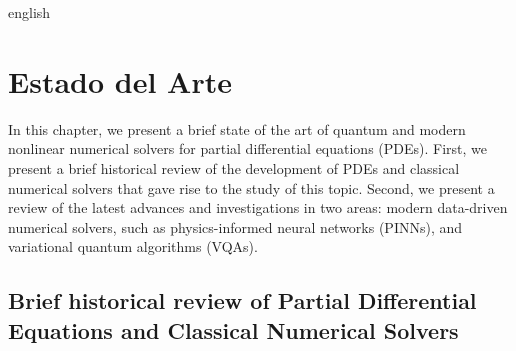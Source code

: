 \documentclass[0000.tex]{subfiles}
\begin{document}

\begin{hyphenrules}{english}

\chapter{Estado del Arte}\label{ch:EstadoDelArte}

In this chapter, we present a brief state of the art of quantum and modern nonlinear numerical solvers for partial differential equations (PDEs). 
First, we present a brief historical review of the development of PDEs and classical numerical solvers that gave rise to the study of this topic. Second, 
we present a review of the latest advances and investigations in two areas: modern data-driven numerical solvers, such as physics-informed neural networks (PINNs), and 
variational quantum algorithms (VQAs).

\section{Brief historical review of Partial Differential Equations and Classical Numerical Solvers}\label{sec:BriefHistoricalReview}


\end{hyphenrules}
\end{document}
